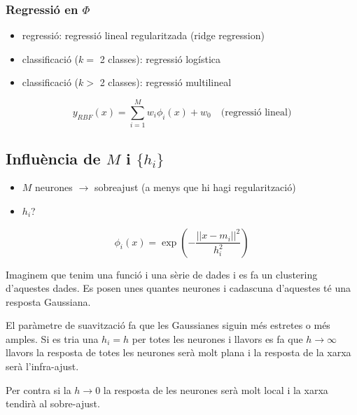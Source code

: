 \documentclass[a4paper]{article}
\begin{document}
\subsubsection{Regressió en $\Phi$}
\begin{itemize}
	\item regressió: regressió lineal regularitzada (ridge regression)
	\item classificació ($k=$ 2 classes): regressió logística
	\item classificació ($k>$ 2 classes): regressió multilineal
\end{itemize}

$$
y_{RBF}(x) = \sum_{i=1}^{M} w_i \phi_i(x) + w_0 \quad \text{(regressió lineal)}
$$

\subsection{Influència de $M$ i $\{h_i\}$}
\begin{itemize}
	\item $M$ neurones $\rightarrow$ sobreajust (a menys que hi hagi regularització)
	\item $h_i$?
\end{itemize}

$$
\phi_i(x) = \exp\left( - \frac{||x - m_i||^2}{h_i^2} \right)
$$

Imaginem que tenim una funció i una sèrie de dades i es fa un clustering d'aquestes dades. Es posen unes quantes neurones i cadascuna d'aquestes té una resposta Gaussiana. 

El paràmetre de suavització fa que les Gaussianes siguin més estretes o més amples. Si es tria una $h_i = h$ per totes les neurones i llavors es fa que $h \rightarrow \infty$ llavors la resposta de totes les neurones serà molt plana i la resposta de la xarxa serà l'infra-ajust.

Per contra si la $h \rightarrow 0$ la resposta de les neurones serà molt local i la xarxa tendirà al sobre-ajust.
\end{document}
